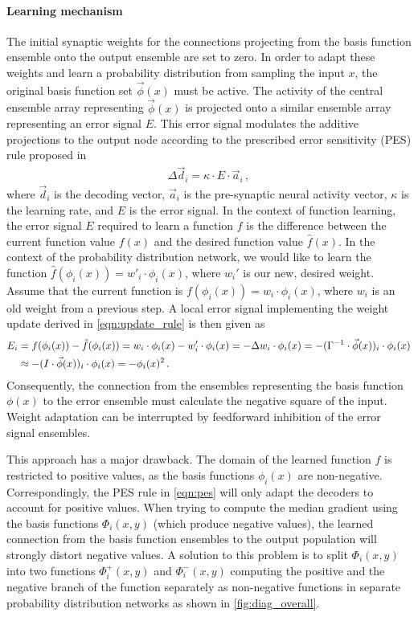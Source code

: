 \documentclass[a4paper,11pt]{article}
\begin{document}
\paragraph{Learning mechanism}
The initial synaptic weights for the connections projecting from the basis function ensemble onto the output ensemble are set to zero. In order to adapt these weights and learn a probability distribution from sampling the input $x$, the original basis function set $\vec \phi(x)$ must be active. The activity of the central ensemble array representing $\vec \phi(x)$ is projected onto a similar ensemble array representing an error signal $E$. This error signal modulates the additive projections to the output node according to the prescribed error sensitivity (PES) rule proposed in \cite{macneil2011finetuning}
\begin{align}
    \Delta \vec d_i = \kappa \cdot E \cdot \vec a_i \,,
    \label{eqn:pes}
\end{align}
where $\vec d_i$ is the decoding vector, $\vec a_i$ is the pre-synaptic neural activity vector, $\kappa$ is the learning rate, and $E$ is the error signal. In the context of function learning, the error signal $E$ required to learn a function $f$ is the difference between the current function value $f(x)$ and the desired function value $\hat f(x)$. In the context of the probability distribution network, we would like to learn the function $\hat f(\phi_i(x)) = w'_i \cdot \phi_i(x)$, where $w_i'$ is our new, desired weight. Assume that the current function is $f(\phi_i(x)) = w_i \cdot \phi_i(x)$, where $w_i$ is an old weight from a previous step. A local error signal implementing the weight update derived in \cref{eqn:update_rule} is then given as
\begin{align}
	E_i &= f(\phi_i(x)) - \hat f(\phi_i(x))
		 = w_i \cdot \phi_i(x) - w'_i \cdot \phi_i(x)
		 = -\Delta w_i \cdot \phi_i(x)
		 = - (\Gamma^{-1} \cdot \vec \phi(x))_i \cdot \phi_i(x) \notag \\
		&\approx - (I \cdot \vec \phi(x))_i \cdot \phi_i(x) = -\phi_i(x)^2
		\,.
\end{align}
Consequently, the connection from the ensembles representing the basis function $\phi(x)$ to the error ensemble must calculate the negative square of the input. Weight adaptation can be interrupted by feedforward inhibition of the error signal ensembles.

This approach has a major drawback. The domain of the learned function $f$ is restricted to positive values, as the basis functions $\phi_i(x)$ are non-negative. Correspondingly, the PES rule in \cref{eqn:pes} will only adapt the decoders to account for positive values. When trying to compute the median gradient using the basis functions $\Phi_i(x, y)$ (which produce negative values), the learned connection from the basis function ensembles to the output population will strongly distort negative values. A solution to this problem is to split $\Phi_i(x, y)$ into two functions $\Phi^+_i(x, y)$ and $\Phi^-_i(x, y)$ computing the positive and the negative branch of the function separately as non-negative functions in separate probability distribution networks as shown in \cref{fig:diag_overall}.
\end{document}
